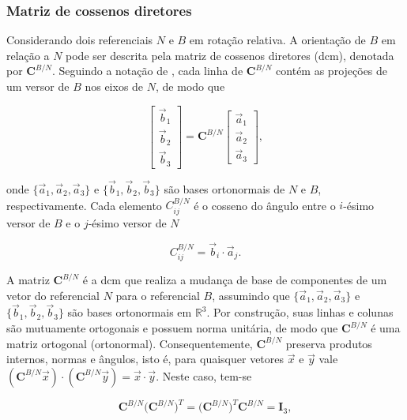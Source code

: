 \subsubsection{Matriz de cossenos diretores}
\label{sec:matriz_cosseno_diretor}

Considerando dois referenciais $N$ e $B$ em rotação relativa.
A orientação de $B$ em relação a $N$ pode ser descrita pela matriz de cossenos diretores (\gls{dcm}), denotada por $\mathbf{C}^{B/N}$.
Seguindo a notação de \cite{wie2008space}, cada linha de $\mathbf{C}^{B/N}$ contém as projeções de um versor de $B$ nos eixos de $N$, de modo que

\begin{equation}
\begin{bmatrix}
\vec{b}_1 \\
\vec{b}_2 \\
\vec{b}_3
\end{bmatrix}
=
\mathbf{C}^{B/N}
\begin{bmatrix}
\vec{a}_1 \\
\vec{a}_2 \\
\vec{a}_3
\end{bmatrix},
\label{eq:def_dcm_ba}
\end{equation}

onde $\{\vec{a}_1,\vec{a}_2,\vec{a}_3\}$ e $\{\vec{b}_1,\vec{b}_2,\vec{b}_3\}$ são bases ortonormais de $N$ e $B$, respectivamente. Cada elemento $C_{ij}^{B/N}$ é o cosseno do ângulo entre o $i$-ésimo versor de $B$ e o
$j$-ésimo versor de $N$

\begin{equation}
C_{ij}^{B/N} = \vec{b}_i \cdot \vec{a}_j.
\end{equation}

A matriz $\mathbf{C}^{B/N}$ é a \gls{dcm} que realiza a mudança de base de componentes de um vetor do referencial $N$ para o referencial $B$, assumindo que $\{\vec{a}_1,\vec{a}_2,\vec{a}_3\}$ e $\{\vec{b}_1,\vec{b}_2,\vec{b}_3\}$ são bases ortonormais em $\mathbb{R}^3$.
Por construção, suas linhas e colunas são mutuamente ortogonais e possuem norma unitária, de modo que $\mathbf{C}^{B/N}$ é uma matriz ortogonal (ortonormal).
Consequentemente, $\mathbf{C}^{B/N}$ preserva produtos internos, normas e ângulos, isto é, para quaisquer vetores $\vec{x}$ e $\vec{y}$ vale $(\mathbf{C}^{B/N}\vec{x})\cdot(\mathbf{C}^{B/N}\vec{y})=\vec{x}\cdot\vec{y}$.
Neste caso, tem-se

\begin{equation}
\mathbf{C}^{B/N}\big(\mathbf{C}^{B/N}\big)^{T}
=
\big(\mathbf{C}^{B/N}\big)^{T}\mathbf{C}^{B/N}
=
\mathbf{I}_3,
\label{eq:ortonormalidade_C}
\end{equation}

